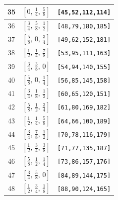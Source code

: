 \documentclass[fleqn,8pt]{jsarticle}
\begin{document}
\begin{longtable}{ccc}
35 & $\left[ 0,\, \frac{1}{4},\, \frac{5}{8} \right]$ & {\tt [45,52,112,114]} \\ \hline
36 & $\left[ \frac{3}{4},\, \frac{5}{8},\, \frac{1}{2} \right]$ & {\tt [48,79,180,185]} \\ \hline
37 & $\left[ \frac{5}{8},\, 0,\, \frac{3}{4} \right]$ & {\tt [49,62,152,181]} \\ \hline
38 & $\left[ \frac{1}{2},\, \frac{1}{4},\, \frac{7}{8} \right]$ & {\tt [53,95,111,163]} \\ \hline
39 & $\left[ \frac{3}{4},\, \frac{3}{8},\, 0 \right]$ & {\tt [54,94,140,155]} \\ \hline
40 & $\left[ \frac{5}{8},\, 0,\, \frac{1}{4} \right]$ & {\tt [56,85,145,158]} \\ \hline
41 & $\left[ \frac{3}{4},\, \frac{1}{8},\, \frac{1}{2} \right]$ & {\tt [60,65,120,151]} \\ \hline
42 & $\left[ \frac{5}{8},\, \frac{1}{2},\, \frac{3}{4} \right]$ & {\tt [61,80,169,182]} \\ \hline
43 & $\left[ \frac{1}{2},\, \frac{1}{4},\, \frac{5}{8} \right]$ & {\tt [64,66,100,189]} \\ \hline
44 & $\left[ \frac{3}{4},\, \frac{7}{8},\, \frac{1}{2} \right]$ & {\tt [70,78,116,179]} \\ \hline
45 & $\left[ \frac{1}{2},\, \frac{3}{4},\, \frac{3}{8} \right]$ & {\tt [71,77,135,187]} \\ \hline
46 & $\left[ \frac{5}{8},\, \frac{1}{2},\, \frac{1}{4} \right]$ & {\tt [73,86,157,176]} \\ \hline
47 & $\left[ \frac{3}{4},\, \frac{5}{8},\, 0 \right]$ & {\tt [84,89,144,175]} \\ \hline
48 & $\left[ \frac{1}{2},\, \frac{3}{4},\, \frac{1}{8} \right]$ & {\tt [88,90,124,165]} \\
\end{longtable}
\renewcommand{\arraystretch}{1.2}
\end{document}
